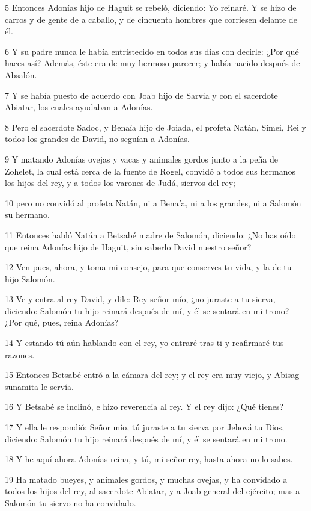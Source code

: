 \par 5 Entonces Adonías hijo de Haguit se rebeló, diciendo: Yo reinaré. Y se hizo de carros y de gente de a caballo, y de cincuenta hombres que corriesen delante de él.
\par 6 Y su padre nunca le había entristecido en todos sus días con decirle: ¿Por qué haces así? Además, éste era de muy hermoso parecer; y había nacido después de Absalón.
\par 7 Y se había puesto de acuerdo con Joab hijo de Sarvia y con el sacerdote Abiatar, los cuales ayudaban a Adonías.
\par 8 Pero el sacerdote Sadoc, y Benaía hijo de Joiada, el profeta Natán, Simei, Rei y todos los grandes de David, no seguían a Adonías.
\par 9 Y matando Adonías ovejas y vacas y animales gordos junto a la peña de Zohelet, la cual está cerca de la fuente de Rogel, convidó a todos sus hermanos los hijos del rey, y a todos los varones de Judá, siervos del rey;
\par 10 pero no convidó al profeta Natán, ni a Benaía, ni a los grandes, ni a Salomón su hermano.
\par 11 Entonces habló Natán a Betsabé madre de Salomón, diciendo: ¿No has oído que reina Adonías hijo de Haguit, sin saberlo David nuestro señor?
\par 12 Ven pues, ahora, y toma mi consejo, para que conserves tu vida, y la de tu hijo Salomón.
\par 13 Ve y entra al rey David, y dile: Rey señor mío, ¿no juraste a tu sierva, diciendo: Salomón tu hijo reinará después de mí, y él se sentará en mi trono? ¿Por qué, pues, reina Adonías?
\par 14 Y estando tú aún hablando con el rey, yo entraré tras ti y reafirmaré tus razones.
\par 15 Entonces Betsabé entró a la cámara del rey; y el rey era muy viejo, y Abisag sunamita le servía.
\par 16 Y Betsabé se inclinó, e hizo reverencia al rey. Y el rey dijo: ¿Qué tienes?
\par 17 Y ella le respondió: Señor mío, tú juraste a tu sierva por Jehová tu Dios, diciendo: Salomón tu hijo reinará después de mí, y él se sentará en mi trono.
\par 18 Y he aquí ahora Adonías reina, y tú, mi señor rey, hasta ahora no lo sabes.
\par 19 Ha matado bueyes, y animales gordos, y muchas ovejas, y ha convidado a todos los hijos del rey, al sacerdote Abiatar, y a Joab general del ejército; mas a Salomón tu siervo no ha convidado.
